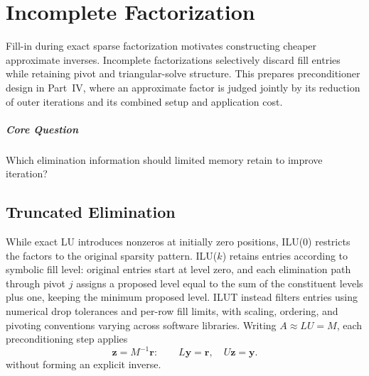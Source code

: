 \chapter{Incomplete Factorization}\label{v0ch:8}
\begin{chaptersummary}
Fill-in during exact sparse factorization motivates constructing cheaper approximate inverses. Incomplete factorizations selectively discard fill entries while retaining pivot and triangular-solve structure. This prepares preconditioner design in Part~IV, where an approximate factor is judged jointly by its reduction of outer iterations and its combined setup and application cost.
\end{chaptersummary}
\paragraph{Core Question}Which elimination information should limited memory retain to improve iteration?

\section{Truncated Elimination}
While exact LU introduces nonzeros at initially zero positions, ILU(0) restricts the factors to the original sparsity pattern. ILU($k$) retains entries according to symbolic fill level: original entries start at level zero, and each elimination path through pivot $j$ assigns a proposed level equal to the sum of the constituent levels plus one, keeping the minimum proposed level. ILUT instead filters entries using numerical drop tolerances and per-row fill limits, with scaling, ordering, and pivoting conventions varying across software libraries.
Writing $A\approx LU=M$, each preconditioning step applies
\[
 \bm z=M^{-1}\bm r:\qquad L\bm y=\bm r,\quad U\bm z=\bm y.
\]
without forming an explicit inverse.
